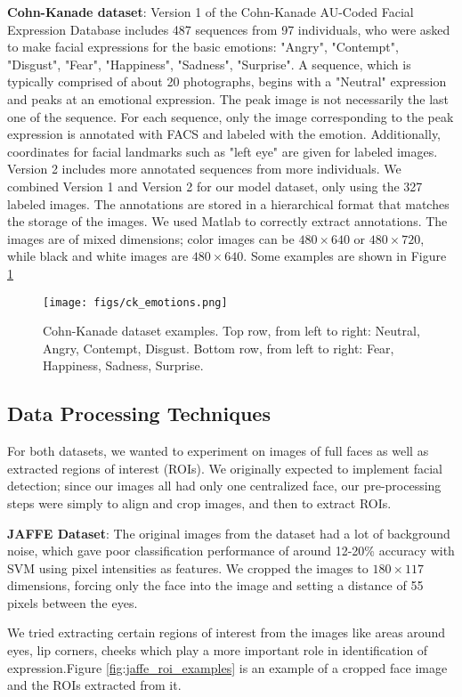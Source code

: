 \documentclass[10pt,twocolumn,letterpaper]{article}
\begin{document}
\textbf{Cohn-Kanade dataset}: Version 1 of the Cohn-Kanade AU-Coded Facial Expression Database \cite{ck} includes 487 sequences from 97 individuals, who were asked to make facial expressions for the basic emotions: "Angry", "Contempt", "Disgust", "Fear", "Happiness", "Sadness", "Surprise". A sequence, which is typically comprised of about 20 photographs, begins with a "Neutral" expression and peaks at an emotional expression. The peak image is not necessarily the last one of the sequence. For each sequence, only the image corresponding to the peak expression is annotated with FACS and labeled with the emotion. Additionally, coordinates for facial landmarks such as "left eye" are given for labeled images. Version 2 includes more annotated sequences from more individuals. We combined Version 1 and Version 2 for our model dataset, only using the 327 labeled images. The annotations are stored in a hierarchical format that matches the storage of the images. We used Matlab to correctly extract annotations. The images are of mixed dimensions; color images can be $480\times640$ or $480\times720$, while black and white images are $480\times640$. Some examples are shown in Figure \ref{fig:ck_examples}

\begin{figure}[h]
\texttt{[image: figs/ck\_emotions.png]}
\caption{Cohn-Kanade dataset examples. Top row, from left to right: Neutral, Angry, Contempt, Disgust. Bottom row, from left to right: Fear, Happiness, Sadness, Surprise.}
\label{fig:ck_examples}
\end{figure}

\subsection{Data Processing Techniques}
For both datasets, we wanted to experiment on images of full faces as well as extracted regions of interest (ROIs). We originally expected to implement facial detection; since our images all had only one centralized face, our pre-processing steps were simply to align and crop images, and then to extract ROIs.

\textbf{
JAFFE Dataset}: The original images from the dataset had a lot of background noise, which gave poor classification performance of around 12-20\% accuracy with SVM using pixel intensities as features. We cropped the images to $180\times117$ dimensions, forcing only the face into the image and setting a distance of 55 pixels between the eyes. 
\par
We tried extracting certain regions of interest from the images like areas around eyes, lip corners, cheeks which play a more important role in identification of expression.Figure \ref{fig:jaffe_roi_examples} is an example of a cropped face image and the ROIs extracted from it.
\end{document}
